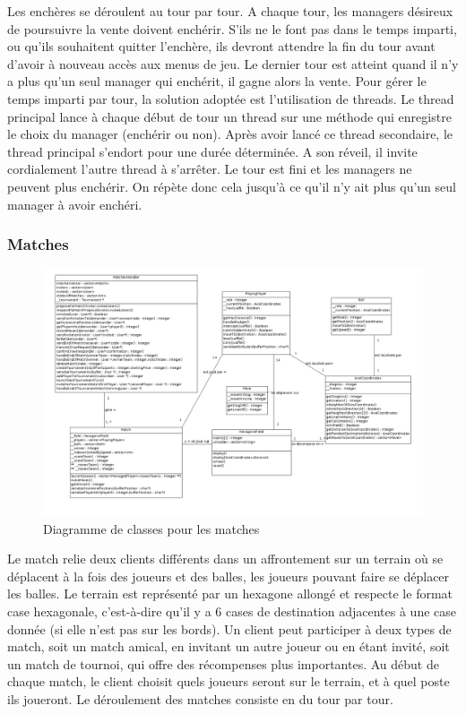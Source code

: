 \documentclass[a4paper,titlepage]{scrreprt}
\begin{document}
        Les enchères se déroulent au tour par tour. A chaque tour, les managers désireux de poursuivre la vente doivent enchérir. S'ils ne le font pas dans le temps imparti, ou qu'ils souhaitent quitter l'enchère, ils devront attendre la fin du tour avant d'avoir à nouveau accès aux menus de jeu. Le dernier tour est atteint quand il n'y a plus qu'un seul manager qui enchérit, il gagne alors la vente.
        Pour gérer le temps imparti par tour, la solution adoptée est l'utilisation de threads. Le thread principal lance à chaque début de tour un thread sur une méthode qui enregistre le choix du manager (enchérir ou non). Après avoir lancé ce thread secondaire, le thread principal s'endort pour une durée déterminée. A son réveil, il invite cordialement l'autre thread à s'arrêter. Le tour est fini et les managers ne peuvent plus enchérir. On répète donc cela jusqu'à ce qu'il n'y ait plus qu'un seul manager à avoir enchéri.

      \subsubsection{Matches}
          \begin{figure}[H]
          \includegraphics[scale=0.35]{uml/class/Match.png}
         \caption{Diagramme de classes pour les matches}
         \end{figure}

            Le match relie deux clients différents dans un affrontement sur un \gls{terrain} où se déplacent à la fois des joueurs et des balles, les joueurs pouvant faire se déplacer les balles. Le terrain est représenté par un hexagone allongé et respecte le format case hexagonale, c'est-à-dire qu'il y a 6 cases de destination adjacentes à une case donnée (si elle n'est pas sur les bords). Un client peut participer à deux types de match, soit un match amical, en invitant un autre joueur ou en étant invité, soit un match de tournoi, qui offre des récompenses plus importantes. Au début de chaque match, le client choisit quels joueurs seront sur le terrain, et à quel poste ils joueront. Le déroulement des matches consiste en du tour par tour.
\end{document}
